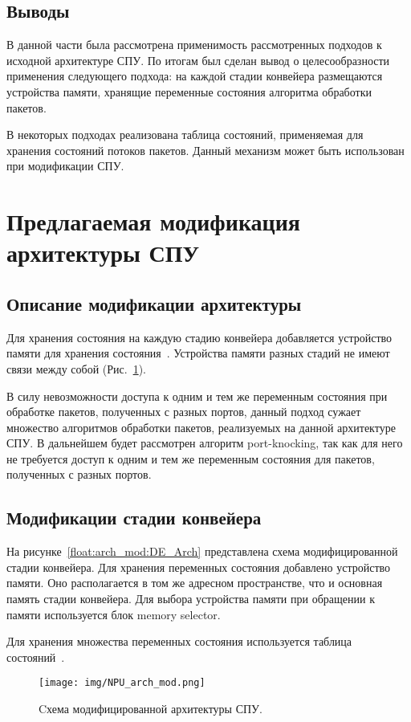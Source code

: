 \documentclass[conference]{IEEEtran}
\begin{document}
\subsection{Выводы}
В данной части была рассмотрена применимость рассмотренных подходов к
исходной архитектуре СПУ. По итогам был сделан вывод о целесообразности
применения следующего подхода: на каждой стадии конвейера размещаются
устройства памяти, хранящие переменные состояния алгоритма обработки
пакетов.

В некоторых подходах реализована таблица состояний, применяемая
для хранения состояний потоков пакетов. Данный механизм может быть
использован при модификации СПУ.


\section{Предлагаемая модификация архитектуры СПУ}

\subsection{Описание модификации архитектуры}
Для хранения состояния на каждую стадию конвейера добавляется
устройство памяти для хранения состояния~\cite{bib:Sivaraman:patent}.
Устройства памяти разных стадий не имеют связи между собой
(Рис.~\ref{float:arch_mod:general}).

В силу невозможности доступа к одним и тем же переменным состояния
при обработке пакетов, полученных с разных портов, данный подход сужает
множество алгоритмов обработки пакетов,
реализуемых на данной архитектуре СПУ. В дальнейшем будет рассмотрен
алгоритм port-knocking,
так как для него не требуется доступ к одним и тем же переменным состояния
для пакетов, полученных с разных портов.

\subsection{Модификации стадии конвейера}
На рисунке~\ref{float:arch_mod:DE_Arch} представлена схема модифицированной
стадии конвейера. Для хранения переменных состояния добавлено
устройство памяти. Оно располагается в том же адресном пространстве, что и
основная память стадии конвейера. Для выбора устройства памяти при
обращении к памяти используется блок memory selector.

Для хранения множества переменных состояния
используется таблица состояний~\cite{bib:Cascone:management}.

\begin{figure}
	\centering
	\texttt{[image: img/NPU\_arch\_mod.png]}
	\caption{Cхема модифицированной архитектуры СПУ.}
	\label{float:arch_mod:general}
\end{figure}
\end{document}
